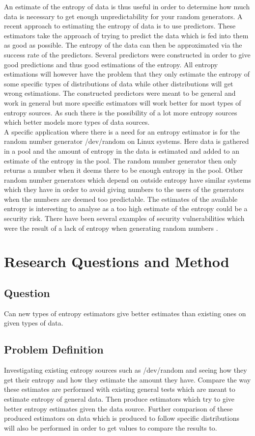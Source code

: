 \documentclass[a4paper,11pt]{report}
\begin{document}
\noindent
An estimate of the entropy of data is thus useful in order to determine
how much data is necessary to get enough unpredictability for your random
generators. A recent approach to estimating the entropy of data is to use 
predictors\cite{eprint-2015-26658}.
These estimators take the approach of trying to predict the data
which is fed into them as good as possible. The entropy of the data can then
be approximated via the success rate of the predictors. Several predictors were
constructed in order to give good predictions and thus good estimations of the 
entropy. All entropy estimations will however have the problem that they only
estimate the entropy of some specific types of distributions of data while 
other distributions will get wrong estimations. The constructed predictors were 
meant to be general and work in general but more specific estimators will work
better for most types of entropy sources. As such there is the possibility of
a lot more entropy sources which better models more types of data sources. \\

\noindent
A specific application where there is a need for an entropy estimator is for
the random number generator /dev/random on Linux systems. Here data is 
gathered in a pool and the amount of entropy in the data is estimated 
and added to an estimate of the entropy in the pool\cite{/dev/random}.
The random number generator then only returns a number when it deems there 
to be enough entropy in the pool.
Other random number generators which depend on outside entropy 
have similar systems which they have in order to avoid giving numbers to 
the users of the generators when the numbers are deemed too predictable.
The estimates of the available entropy is interesting to analyse as a 
too high estimate of the entropy could be a security risk. There have been 
several examples of security vulnerabilities which were the result of a lack
of entropy when generating random numbers\cite{goldberg1996randomness}
\cite{yilek2009private}.
\section*{Research Questions and Method}
\subsection*{Question}
Can new types of entropy estimators give better estimates than existing
ones on given types of data.
\subsection*{Problem Definition}
Investigating existing entropy sources such as /dev/random and seeing how
they get their entropy and how they estimate the amount they have. Compare the
way these estimates are performed with existing general tests which are meant 
to estimate entropy of general data. Then produce estimators which try to give
better entropy estimates given the data source.
Further comparison of these produced estimators on data which is produced
to follow specific distributions will also be performed in order to get 
values to compare the results to.
\end{document}
